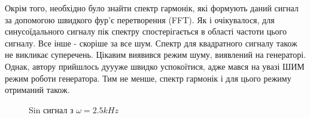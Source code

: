 Окрім того, необхідно було знайти спектр гармонік, які формують даний сигнал за допомогою швидкого фур'є перетворення (FFT). Як і очікувалося, для синусоїдального сигналу пік спектру спостерігається в області частоти цього сигналу. Все інше - скоріше за все шум. Спектр для квадратного сигналу також не викликає суперечень. Цікавим виявився режим шуму, виявлений на генераторі. Однак, автору прийшлось дуууже швидко успокоїтися, адже мався на увазі ШИМ режим роботи генератора. Тим не менше, спектр гармонік і для цього режиму отриманий також.
\begin{figure}[h]
	\begin{minipage}[h]{0.47\linewidth}
		 Sin сигнал з $\omega=2.5 kHz$ \\
	\end{minipage}
	\hfill
	\begin{minipage}[h]{0.47\linewidth}

\end{minipage}
\end{figure}
